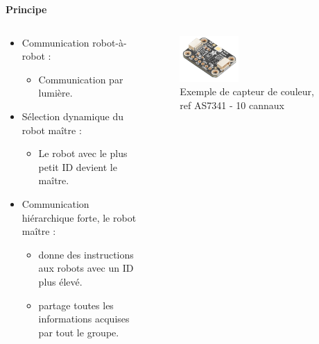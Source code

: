 \documentclass[aspectratio=169,10pt]{beamer}
\begin{document}
\begin{frame}{\textbf{Principe}}
	\begin{columns}
		\begin{column}{0.6\textwidth}
			\begin{itemize}
				\item Communication robot-à-robot :
				\begin{itemize}
					\item Communication par lumière.
				\end{itemize}
				\vspace{0.2cm}
				\item Sélection dynamique du robot maître :
				\begin{itemize}
					\item Le robot avec le plus petit ID devient le maître.
				\end{itemize}
				\vspace{0.2cm}
				\item Communication hiérarchique forte, le robot maître :
				\begin{itemize}
					\item donne des instructions aux robots avec un ID plus élevé.
					\item partage toutes les informations acquises par tout le groupe.
				\end{itemize}
			\end{itemize}
		\end{column}
		\begin{column}{0.4\textwidth}
			\begin{figure}
				\centering
				\includegraphics[width=0.4\textwidth]{IMAGES/color_sensor.png}
				\caption{Exemple de capteur de couleur, ref AS7341 - 10 cannaux}
				\label{fig:color_sensor}
			\end{figure}
		\end{column}
	\end{columns}
\end{frame}
\end{document}
